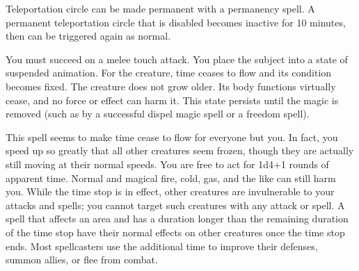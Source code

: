 \begin{multicols}{2}
\begin{small}
\smallskip\noindent Teleportation circle can be made permanent with a permanency spell. A permanent teleportation circle that is disabled becomes inactive for 10 minutes, then can be triggered again as normal.


\noindent You must succeed on a melee touch attack. You place the subject into a state of suspended animation. For the creature, time ceases to flow and its condition becomes fixed. The creature does not grow older. Its body functions virtually cease, and no force or effect can harm it. This state persists until the magic is removed (such as by a successful dispel magic spell or a freedom spell).


\noindent This spell seems to make time cease to flow for everyone but you. In fact, you speed up so greatly that all other creatures seem frozen, though they are actually still moving at their normal speeds. You are free to act for 1d4+1 rounds of apparent time. Normal and magical fire, cold, gas, and the like can still harm you. While the time stop is in effect, other creatures are invulnerable to your attacks and spells; you cannot target such creatures with any attack or spell. A spell that affects an area and has a duration longer than the remaining duration of the time stop have their normal effects on other creatures once the time stop ends. Most spellcasters use the additional time to improve their defenses, summon allies, or flee from combat.


\end{small}
\end{multicols}
